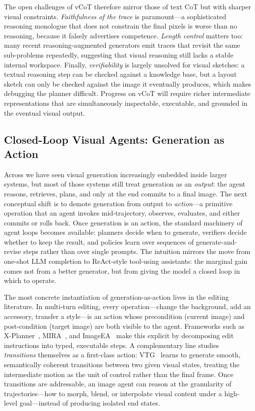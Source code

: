 The open challenges of vCoT therefore mirror those of text CoT but with sharper visual constraints. \emph{Faithfulness of the trace} is paramount---a sophisticated reasoning monologue that does not constrain the final pixels is worse than no reasoning, because it falsely advertises competence. \emph{Length control} matters too: many recent reasoning-augmented generators emit traces that revisit the same sub-problems repeatedly, suggesting that visual reasoning still lacks a stable internal workspace. Finally, \emph{verifiability} is largely unsolved for visual sketches: a textual reasoning step can be checked against a knowledge base, but a layout sketch can only be checked against the image it eventually produces, which makes debugging the planner difficult. Progress on vCoT will require richer intermediate representations that are simultaneously inspectable, executable, and grounded in the eventual visual output.

\subsection{Closed-Loop Visual Agents: Generation as Action}
\label{subsec:closed_loop_agents}

Across  we have seen visual generation increasingly embedded inside larger systems, but most of those systems still treat generation as an \emph{output}: the agent reasons, retrieves, plans, and only at the end commits to a final image. The next conceptual shift is to demote generation from output to \emph{action}---a primitive operation that an agent invokes mid-trajectory, observes, evaluates, and either commits or rolls back. Once generation is an action, the standard machinery of agent loops becomes available: planners decide when to generate, verifiers decide whether to keep the result, and policies learn over sequences of generate-and-revise steps rather than over single prompts. The intuition mirrors the move from one-shot LLM completion to ReAct-style tool-using assistants: the marginal gain comes not from a better generator, but from giving the model a closed loop in which to operate.

The most concrete instantiation of generation-as-action lives in the editing literature. In multi-turn editing, every operation---change the background, add an accessory, transfer a style---is an action whose precondition (current image) and post-condition (target image) are both visible to the agent. Frameworks such as X-Planner~\citep{Yeh2025BeyondSE}, MIRA~\citep{Zeng2025MIRAMI}, and ImageEA~\citep{Hu2025ImageEA} make this explicit by decomposing edit instructions into typed, executable steps. A complementary line studies \emph{transitions} themselves as a first-class action: VTG~\citep{yang2025vtg} learns to generate smooth, semantically coherent transitions between two given visual states, treating the intermediate motion as the unit of control rather than the final frame. Once transitions are addressable, an image agent can reason at the granularity of trajectories---how to morph, blend, or interpolate visual content under a high-level goal---instead of producing isolated end states.

